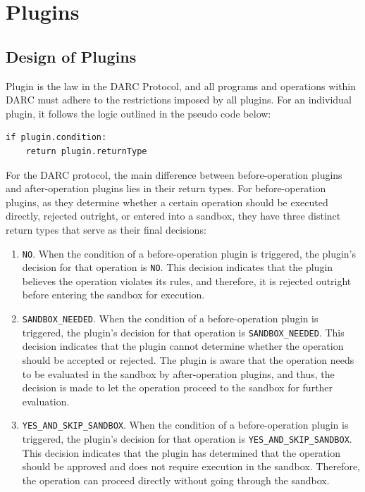 \documentclass[main.tex]{subfiles}
\begin{document}
\section{Plugins}

\subsection{Design of Plugins}

Plugin is the law in the DARC Protocol, and all programs and operations within DARC must adhere to the restrictions imposed by all plugins. For an individual plugin, it follows the logic outlined in the pseudo code below:

\begin{verbatim}
if plugin.condition:
    return plugin.returnType
\end{verbatim}

For the DARC protocol, the main difference between before-operation plugins and after-operation plugins lies in their return types. For before-operation plugins, as they determine whether a certain operation should be executed directly, rejected outright, or entered into a sandbox, they have three distinct return types that serve as their final decisions:

\begin{enumerate}
    \item \texttt{NO}. When the condition of a before-operation plugin is triggered, the plugin's decision for that operation is \texttt{NO}. This decision indicates that the plugin believes the operation violates its rules, and therefore, it is rejected outright before entering the sandbox for execution.

    \item \texttt{SANDBOX\_NEEDED}. When the condition of a before-operation plugin is triggered, the plugin's decision for that operation is \texttt{SANDBOX\_NEEDED}. This decision indicates that the plugin cannot determine whether the operation should be accepted or rejected. The plugin is aware that the operation needs to be evaluated in the sandbox by after-operation plugins, and thus, the decision is made to let the operation proceed to the sandbox for further evaluation.

    \item \texttt{YES\_AND\_SKIP\_SANDBOX}. When the condition of a before-operation plugin is triggered, the plugin's decision for that operation is \texttt{YES\_AND\_SKIP\_SANDBOX}. This decision indicates that the plugin has determined that the operation should be approved and does not require execution in the sandbox. Therefore, the operation can proceed directly without going through the sandbox.
\end{enumerate}
\end{document}
